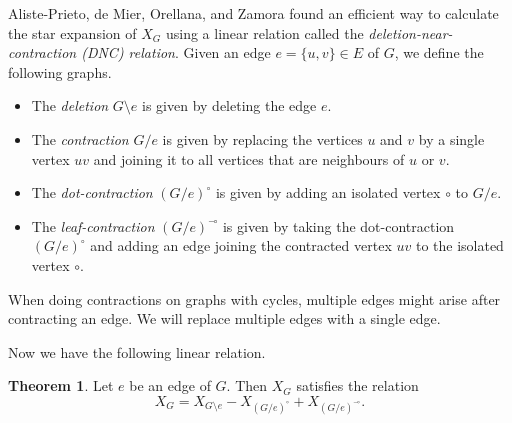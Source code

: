 \documentclass[12pt]{amsart}  %
\theoremstyle{definition}
\newtheorem{theorem}{Theorem}[section]
\theoremstyle{remark}
\numberwithin{equation}{section}
\begin{document}
Aliste-Prieto, de Mier, Orellana, and Zamora \cite{markedgraphs} found an efficient way to calculate the star expansion of $X_G$ using a linear relation called the \emph{deletion-near-contraction (DNC) relation}. Given an edge $e=\{u,v\}\in E$ of $G$, we define the following graphs. \begin{itemize}
\item The \emph{deletion} $G\setminus e$ is given by deleting the edge $e$.
\item The \emph{contraction} $G/e$ is given by replacing the vertices $u$ and $v$ by a single vertex $uv$ and joining it to all vertices that are neighbours of $u$ or $v$.
\item The \emph{dot-contraction} $(G/e)^\circ$ is given by adding an isolated vertex $\circ$ to $G/e$.
\item The \emph{leaf-contraction} $(G/e)^\multimap$ is given by taking the dot-contraction $(G/e)^\circ$ and adding an edge joining the contracted vertex $uv$ to the isolated vertex $\circ$.
\end{itemize}

When doing contractions on graphs with cycles, multiple edges might arise after contracting an edge. We will replace multiple edges with a single edge. 

Now we have the following linear relation.

\begin{theorem}
\cite[Proposition 3.1]{markedgraphs} Let $e$ be an edge of $G$. Then $X_G$ satisfies the relation
\begin{equation} \label{eq:dncrelation}
X_G=X_{G\setminus e}-X_{(G/e)^\circ}+X_{(G/e)^\multimap}.
\end{equation}
\end{theorem}
\end{document}
